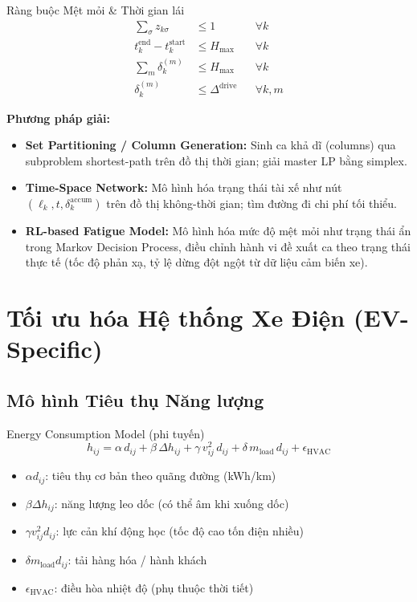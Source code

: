 \documentclass[12pt,a4paper]{article}
\begin{document}
\begin{formulabox}{Ràng buộc Mệt mỏi \& Thời gian lái}
\begin{align}
  \sum_\sigma z_{k\sigma} &\leq 1 &&\forall k \tag{CS1: Mỗi tài xế 1 ca/ngày}\\
  t_k^{\mathrm{end}} - t_k^{\mathrm{start}} &\leq H_{\max} &&\forall k \tag{CS2: Tổng giờ lái}\\
  \sum_m \delta_k^{(m)} &\leq H_{\max} &&\forall k \tag{CS3: Tổng tích lũy}\\
  \delta_k^{(m)} &\leq \Delta^{\mathrm{drive}} &&\forall k,m \tag{CS4: Giới hạn liên tục}
\end{align}
\end{formulabox}

\textbf{Phương pháp giải:}

\begin{itemize}
  \item \textbf{Set Partitioning / Column Generation:} Sinh ca khả dĩ (columns) qua
    subproblem shortest-path trên đồ thị thời gian; giải master LP bằng simplex.
  \item \textbf{Time-Space Network:} Mô hình hóa trạng thái tài xế như nút
    $(\ell_k, t, \delta_k^{\mathrm{accum}})$ trên đồ thị không-thời gian; tìm đường
    đi chi phí tối thiểu.
  \item \textbf{RL-based Fatigue Model:} Mô hình hóa mức độ mệt mỏi như trạng thái
    ẩn trong Markov Decision Process, điều chỉnh hành vi đề xuất ca theo trạng thái
    thực tế (tốc độ phản xạ, tỷ lệ dừng đột ngột từ dữ liệu cảm biến xe).
\end{itemize}

\section{Tối ưu hóa Hệ thống Xe Điện (EV-Specific)}

\subsection{Mô hình Tiêu thụ Năng lượng}

\begin{evbox}{Energy Consumption Model (phi tuyến)}
\begin{equation}
  h_{ij} = \alpha\,d_{ij} + \beta\,\Delta h_{ij} + \gamma\,v_{ij}^2\,d_{ij}
           + \delta\,m_{\mathrm{load}}\,d_{ij} + \epsilon_{\mathrm{HVAC}}
\end{equation}
\begin{itemize}
  \item $\alpha d_{ij}$: tiêu thụ cơ bản theo quãng đường (kWh/km)
  \item $\beta\Delta h_{ij}$: năng lượng leo dốc (có thể âm khi xuống dốc)
  \item $\gamma v_{ij}^2 d_{ij}$: lực cản khí động học (tốc độ cao tốn điện nhiều)
  \item $\delta m_{\mathrm{load}} d_{ij}$: tải hàng hóa / hành khách
  \item $\epsilon_{\mathrm{HVAC}}$: điều hòa nhiệt độ (phụ thuộc thời tiết)
\end{itemize}
\end{evbox}
\end{document}

